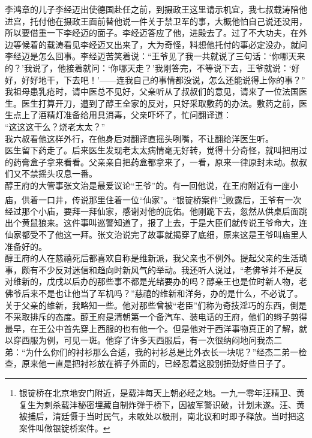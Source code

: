 李鸿章的儿子李经迈出使德国赴任之前，到摄政王这里请示机宜，我七叔载涛陪他进宫，托付他在摄政王面前替他说一件关于禁卫军的事，大概他怕自己说还没用，所以要借重一下李经迈的面子。李经迈答应了他，进殿去了。过了不大功夫，在外边等候着的载涛看见李经迈又出来了，大为奇怪，料想他托付的事必定没办，就问李经迈是怎么回事。李经迈苦笑着说：“王爷见了我一共就说了三句话：‘你哪天来的？’我说了，他接着就问：‘你哪天走？’我刚答完，不等说下去，王爷就说：‘好好，好好地干，下去吧！’——连我自己的事情都没说，怎么还能说得上你的事？”\\

我祖母患乳疮时，请中医总不见好，父亲听从了叔叔们的意见，请来了一位法国医生。医生打算开刀，遭到了醇王全家的反对，只好采取敷药的办法。敷药之前，医生点上了酒精灯准备给用具消毒，父亲吓坏了，忙问翻译道：\\

“这这这干么？烧老太太？”\\

我六叔看他这样外行，在他身后对翻译直摇头咧嘴，不让翻给洋医生听。\\

医生留下药走了。后来医生发现老太太病情毫无好转，觉得十分奇怪，就叫把用过的药膏盒子拿来看看。父亲亲自把药盒都拿来了，一看，原来一律原封未动。叔叔们又不禁摇头叹息一番。\\

醇王府的大管事张文治是最爱议论“王爷”的。有一回他说，在王府附近有一座小庙，供着一口井，传说那里住着一位“仙家”。“银锭桥案件”\footnote{银锭桥在北京地安门附近，是载沣每天上朝必经之地。一九一零年汪精卫、黄复生为刺杀载沣秘密埋藏自制炸弹于桥下，因被军警识破，计划未遂。汪、黄被捕后，清廷慑于当时民气，未敢处以极刑，南北议和时即予释放。当时把这案件叫做银锭桥案件。
}败露后，王爷有一次经过那个小庙，要拜一拜仙家，感谢对他的庇佑。他刚跪下去，忽然从供桌后面跳出个黄鼠狼来。这件事叫巡警知道了，报了上去，于是大臣们就传说王爷命大，连仙家都受不了他这一拜。张文治说完了故事就揭穿了底细，原来这是王爷叫庙里人准备好的。\\

醇王府的人在慈禧死后都喜欢自称是维新派，我父亲也不例外。提起父亲的生活琐事，颇有不少反对迷信和趋向时新风气的举动。我还听人说过，“老佛爷并不是反对维新的，戊戌以后办的那些事不都是光绪要办的吗？醇亲王也是位时新人物，老佛爷后来不是也让他当了军机吗？”慈禧的维新和洋务，办的是什么，不必说了。关于父亲的维新，我略知一些。他对那些曾被“老臣”们称为奇技淫巧的东西，倒是不采取排斥的态度。醇王府是清朝第一个备汽车、装电话的王府，他们的辫子剪得最早，在王公中首先穿上西服的也有他一个。但是他对于西洋事物真正的了解，就以穿西服为例，可见一斑。他穿了许多天西服后，有一次很纳闷地问我杰二弟：“为什么你们的衬衫那么合适，我的衬衫总是比外衣长一块呢？”经杰二弟一检查，原来他一直是把衬衫放在裤子外面的，已经忍着这股别扭劲好些日子了。\\

